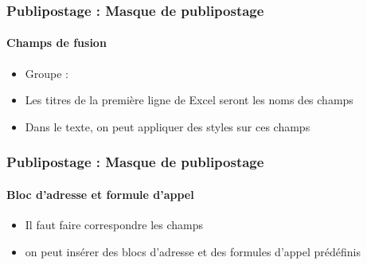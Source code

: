 \documentclass[xcolor=table]{beamer}
\begin{document}
\begin{frame}
\frametitle{Publipostage : Masque de publipostage}
\framesubtitle{Champs de fusion}

\begin{minipage}{0.63\textwidth}
	\begin{itemize}
		\item Groupe : 
		\item Les titres de la première ligne de Excel seront les noms des champs 
		\item Dans le texte, on peut appliquer des styles sur ces champs
	\end{itemize}
\end{minipage}
\begin{minipage}{0.36\textwidth}
	
\end{minipage}

\end{frame}

\begin{frame}
\frametitle{Publipostage : Masque de publipostage}
\framesubtitle{Bloc d'adresse et formule d'appel}

\begin{minipage}{0.69\textwidth}
	\begin{itemize}
		\item Il faut faire correspondre les champs 
		\item on peut insérer des blocs d'adresse et des formules d'appel prédéfinis
	\end{itemize}

\end{minipage}
\begin{minipage}{0.30\textwidth}
	
	~\vfill
	
\end{minipage}

\end{frame}
\end{document}
